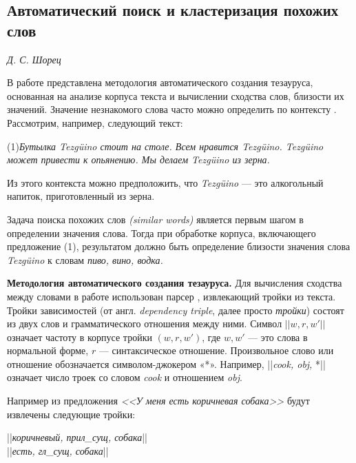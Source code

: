 \documentclass{article}
\begin{document}
\begin{articletext}
\section{Автоматический поиск и кластеризация похожих слов}

\begin{flushright}
\textit{Д. С. Шорец} 
\end{flushright}

В работе \cite{Dekang 1998} представлена методология автоматического создания тезауруса, основанная на анализе корпуса текста и вычислении сходства слов, близости их значений. Значение незнакомого слова часто можно определить по контексту \cite{Eugene 1975}.  Рассмотрим, например, следующий текст:
\begin{flushright}
(1)\textit{Бутылка Tezg\"uino стоит на столе. Всем нравится Tezg\"uino. Tezg\"uino может привести к опьянению. Мы делаем Tezg\"uino из зерна.} 
\end{flushright}

Из этого контекста можно предположить, что \textit{Tezg\"uino} --- это алкогольный напиток, приготовленный из зерна.

Задача поиска похожих слов \textit{(similar words)} является первым шагом в определении значения слова. Тогда при обработке корпуса, включающего предложение (1), результатом должно быть определение близости значения слова \textit{Tezg\"uino} к словам \textit{пиво, вино, водка.}

\textbf{Методология автоматического создания тезауруса.} Для вычисления сходства между словами в работе \cite{Dekang 1998} использован парсер \cite{Dekang 1993}, извлекающий тройки из текста. Тройки зависимостей (от англ. \textit{dependency triple}, далее просто \textit{тройки}) состоят из двух слов и грамматического отношения между ними. Символ $||w, r, w'||$ означает частоту в корпусе тройки $(w, r, w')$, где $w, w'$ --- это слова в нормальной форме, $r$ --- синтаксическое отношение. Произвольное слово или отношение обозначается символом-джокером «*». Например, ||\textit{cook, obj,} *|| означает число троек со словом \textit{cook} и отношением \textit{obj}. 

Например из предложения \textit{<<У меня есть коричневая собака>>} будут извлечены следующие тройки:

\begin{center}
||\textit{коричневый, прил\_сущ, собака}||\\
||\textit{есть, гл\_сущ, собака}|| 
\end{center}


\end{articletext}
\end{document}
